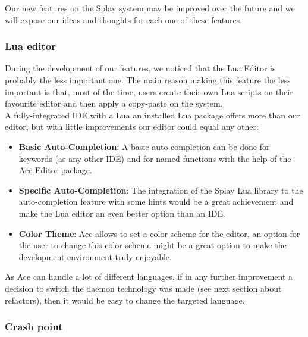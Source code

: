 \documentclass{eplmastersthesis}
\begin{document}
        Our new features on the Splay system may be improved over the future
        and we will expose our ideas and thoughts for each one of these
        features.

        \subsubsection{Lua editor}

        During the development of our features, we noticed that the Lua Editor
        is probably the less important one. The main reason making this feature
        the less important is that, most of the time, users create their own Lua
        scripts on their favourite editor and then apply a copy-paste on the
        system.\\
        A fully-integrated IDE with a Lua an installed Lua package offers more
        than our editor, but with little improvements our editor could equal
        any other:

        \begin{itemize}
          \item \textbf{Basic Auto-Completion}: A basic auto-completion can be
          done for keywords (as any other IDE) and for named functions with
          the help of the Ace Editor package.
          \item \textbf{Specific Auto-Completion}: The integration of the Splay
          Lua library to the auto-completion feature with some hints would
          be a great achievement and make the Lua editor an even better
          option than an IDE.
          \item \textbf{Color Theme}: Ace allows to set a color scheme for
          the editor, an option for the user to change this color scheme
          might be a great option to make the development environment
          truly enjoyable.
        \end{itemize}

        As Ace can handle a lot of different languages, if in any further
        improvement a decision to switch the daemon technology was made (see
        next section about refactors), then it would be easy to change the
        targeted language.

        \subsubsection{Crash point}
\end{document}
